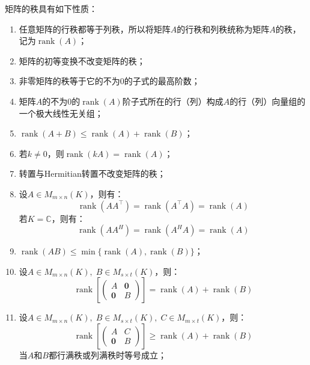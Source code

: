 \begin{property}\label{prop:MatrixRank}
	矩阵的秩具有如下性质：
	\begin{enumerate}
		\item 任意矩阵的行秩都等于列秩，所以将矩阵$A$的行秩和列秩统称为矩阵$A$的秩，记为$\operatorname{rank}(A)$；
		\item 矩阵的初等变换不改变矩阵的秩；
		\item 非零矩阵的秩等于它的不为$0$的子式的最高阶数；
		\item 矩阵$A$的不为$0$的$\operatorname{rank}(A)$阶子式所在的行（列）构成$A$的行（列）向量组的一个极大线性无关组；
		\item $\operatorname{rank}(A+B)\leqslant\operatorname{rank}(A)+\operatorname{rank}(B)$；
		\item 若$k\ne0$，则$\operatorname{rank}(kA)=\operatorname{rank}(A)$；
		\item 转置与Hermitian转置不改变矩阵的秩；
		\item 设$A\in M_{m\times n}(K)$，则有：
		\begin{equation*}
			\operatorname{rank}(AA^{\top})=\operatorname{rank}(A^{\top}A)=\operatorname{rank}(A)
		\end{equation*}
		若$K=\mathbb{C}$，则有：
		\begin{equation*}
			\operatorname{rank}(AA^H)=\operatorname{rank}(A^HA)=\operatorname{rank}(A)
		\end{equation*}
		\item $\operatorname{rank}(AB)\leqslant\min\{\operatorname{rank}(A),\operatorname{rank}(B)\}$；
		\item 设$A\in M_{m\times n}(K),\;B\in M_{s\times t}(K)$，则：
		\begin{equation*}
			\operatorname{rank}\left[
			\begin{pmatrix}
				A & \mathbf{0} \\
				\mathbf{0} & B
			\end{pmatrix}
			\right]=\operatorname{rank}(A)+\operatorname{rank}(B)
		\end{equation*}
		\item 设$A\in M_{m\times n}(K),\;B\in M_{s\times t}(K),\;C\in M_{m\times t}(K)$，则：
		\begin{equation*}
			\operatorname{rank}\left[
			\begin{pmatrix}
				A & C\\
				\mathbf{0} & B
			\end{pmatrix}
			\right]\geqslant\operatorname{rank}(A)+\operatorname{rank}(B)
		\end{equation*}
		当$A$和$B$都行满秩或列满秩时等号成立；
	\end{enumerate}
\end{property}

